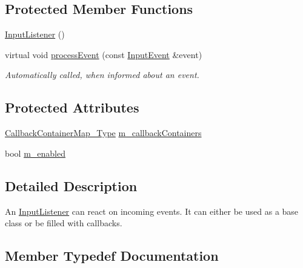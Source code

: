 \subsection*{Protected Member Functions}
\begin{DoxyCompactItemize}
\item 
\mbox{\hyperlink{classec_1_1_input_listener_aa44d25c2b2d3ef5e72611831fd66e10c}{Input\+Listener}} ()
\item 
virtual void \mbox{\hyperlink{classec_1_1_input_listener_a9ceaefc79c6b0b260e88454616137840}{process\+Event}} (const \mbox{\hyperlink{structec_1_1_input_event}{Input\+Event}} \&event)
\begin{DoxyCompactList}\small\item\em Automatically called, when informed about an event. \end{DoxyCompactList}\end{DoxyCompactItemize}
\subsection*{Protected Attributes}
\begin{DoxyCompactItemize}
\item 
\mbox{\hyperlink{classec_1_1_input_listener_abf0825f1f31a1373c5c03e51da123148}{Callback\+Container\+Map\+\_\+\+Type}} \mbox{\hyperlink{classec_1_1_input_listener_a4553825c97688ab1827d6f4849c92b61}{m\+\_\+callback\+Containers}}
\item 
bool \mbox{\hyperlink{classec_1_1_input_listener_af36b5fc46ed59886d73b1613aaef5a47}{m\+\_\+enabled}}
\end{DoxyCompactItemize}


\subsection{Detailed Description}
An \mbox{\hyperlink{classec_1_1_input_listener}{Input\+Listener}} can react on incoming events. It can either be used as a base class or be filled with callbacks. 

\subsection{Member Typedef Documentation}
\mbox{\label{classec_1_1_input_listener_abf0825f1f31a1373c5c03e51da123148}} 
